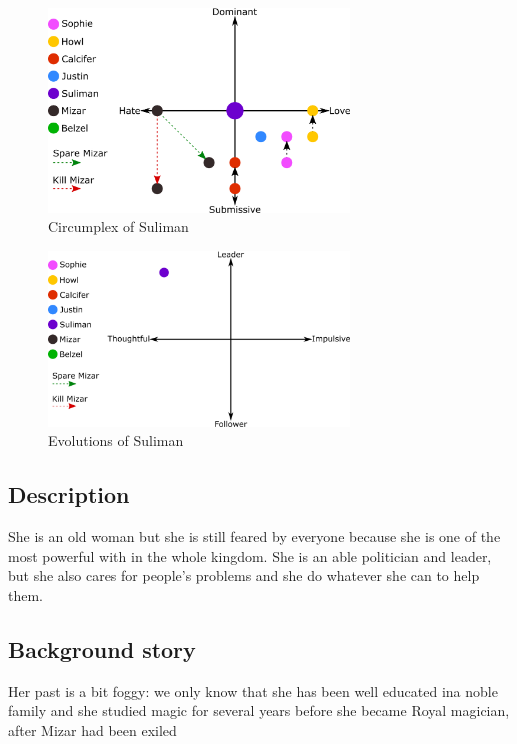 \begin{figure}
  \centering
  \includegraphics[width=8cm]{Images/Circumplexes/sulimanCircumplex}
  \caption{Circumplex of Suliman}
\end{figure}

\begin{figure}
  \centering
   \includegraphics[width=8cm]{Images/Evolutions/sulimanEvolution}
  \caption{Evolutions of Suliman}
\end{figure}

\subsection{Description}
She is an old woman but she is still feared by everyone because she is one of the most powerful with in the whole kingdom. She is an able politician and leader, but she also cares for people's problems and she do whatever she can to help them.
\subsection{Background story}
Her past is a bit foggy: we only know that she has been well educated ina noble family and she studied magic for several years before she became Royal magician, after Mizar had been exiled
